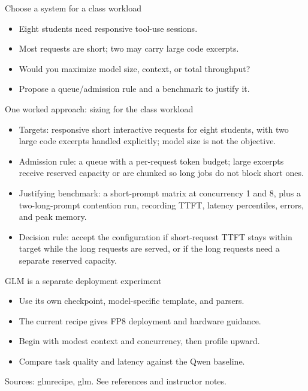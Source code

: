 \documentclass[aspectratio=169,11pt]{beamer}
\begin{document}
\begin{frame}[t,fragile]{Choose a system for a class workload}
\fontsize{11.5}{14}\selectfont
\begin{itemize}\setlength{\itemsep}{2mm}
\item Eight students need responsive tool-use sessions.
\item Most requests are short; two may carry large code excerpts.
\item Would you maximize model size, context, or total throughput?
\item Propose a queue/admission rule and a benchmark to justify it.
\end{itemize}
\end{frame}
\begin{frame}[t,fragile]{One worked approach: sizing for the class workload}
\fontsize{11.5}{14}\selectfont
\begin{itemize}\setlength{\itemsep}{2mm}
\item Targets: responsive short interactive requests for eight students, with two large code excerpts handled explicitly; model size is not the objective.
\item Admission rule: a queue with a per-request token budget; large excerpts receive reserved capacity or are chunked so long jobs do not block short ones.
\item Justifying benchmark: a short-prompt matrix at concurrency 1 and 8, plus a two-long-prompt contention run, recording TTFT, latency percentiles, errors, and peak memory.
\item Decision rule: accept the configuration if short-request TTFT stays within target while the long requests are served, or if the long requests need a separate reserved capacity.
\end{itemize}
\end{frame}
\begin{frame}[t,fragile]{GLM is a separate deployment experiment}
\fontsize{11.5}{14}\selectfont
\begin{itemize}\setlength{\itemsep}{2mm}
\item Use its own checkpoint, model-specific template, and parsers.
\item The current recipe gives FP8 deployment and hardware guidance.
\item Begin with modest context and concurrency, then profile upward.
\item Compare task quality and latency against the Qwen baseline.
\end{itemize}
\vfill{\fontsize{6.5}{8}\selectfont\color{UTgray} Sources: glmrecipe, glm. See references and instructor notes.\par}
\end{frame}
\end{document}
